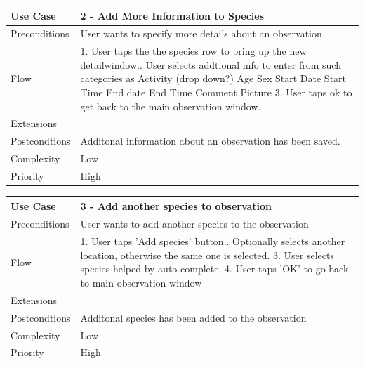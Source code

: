 \begin{tabular}[t]{|l|p{}|}\hline
Use Case&2 - Add More Information to Species\\\hline
Preconditions&User wants to specify more details about an observation\\\hline
Flow& 1. User taps the the species row to bring up the new detailwindow.\newline
2. User selects addtional info to enter from such categories as \newline
Activity (drop down?) \newline
Age\newline
Sex\newline
Start Date\newline
Start Time\newline
End date \newline
End Time \newline
Comment \newline
Picture \newline
3. User taps ok to get back to the main observation window.\\\hline
Extensions& \\\hline
Postcondtions&Additonal information about an observation has been saved.\\\hline
Complexity&Low\\\hline
Priority&High\\\hline
\end{tabular}

\hspace{2em}

\begin{tabular}[t]{|l|p{}|}\hline
Use Case&3 - Add another species to observation\\\hline
Preconditions&User wants to add another species to the observation\\\hline
Flow&1. User taps 'Add species' button.\newline
2. Optionally selects another location, otherwise the same one is selected.
3. User selects species helped by auto complete.
4. User taps 'OK' to go back to main observation window \\\hline  
Extensions& \\\hline
Postcondtions&Additonal species has been added to the observation\\\hline
Complexity&Low\\\hline
Priority&High\\\hline
\end{tabular}

